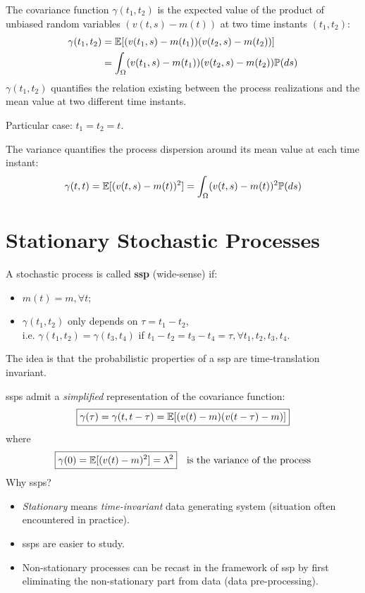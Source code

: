 \begin{defn}
	The covariance function $\gamma(t_{1}, t_{2})$ is the expected value of the product of unbiased random variables $(v(t, s)-m(t))$ at two time instants $(t_{1}, t_{2})$:
	\begin{align*}
		\gamma(t_{1}, t_{2}) &=\mathbb{E}[(v(t_{1}, s)-m(t_{1}))(v(t_{2}, s)-m(t_{2}))] \\
		&=\int_{\Omega}(v(t_{1}, s)-m(t_{1}))(v(t_{2}, s)-m(t_{2})) \mathbb{P}(ds)
	\end{align*}
	$\gamma(t_{1}, t_{2})$ quantifies the relation existing between the process realizations and the mean value at two different time instants.
\end{defn}

Particular case: $t_{1}=t_{2}=t$.
\begin{defn}[Variance]
	The variance quantifies the process dispersion around its mean value at each time instant:
	\[
		\gamma(t, t)=\mathbb{E}[(v(t, s)-m(t))^{2}]=\int_{\Omega}(v(t, s)-m(t))^{2} \mathbb{P}(ds)
	\]
\end{defn}

\section{Stationary Stochastic Processes}
\begin{defn}
	A stochastic process is called \textbf{\gls{ssp}} (wide-sense) if:
	\begin{itemize}
		\item $m(t)=m, \forall t$;
		\item $\gamma(t_{1}, t_{2})$ only depends on $\tau=t_{1}-t_{2}$,\\
		i.e. $\gamma(t_{1}, t_{2})=\gamma(t_{3}, t_{4})$ if $t_{1}-t_{2}=t_{3}-t_{4}=\tau, \forall t_{1}, t_{2}, t_{3}, t_{4}$.
	\end{itemize}
\end{defn}
The idea is that the probabilistic properties of a \gls{ssp} are time-translation invariant.

\glspl{ssp} admit a \emph{simplified} representation of the covariance function:
\[
	\boxed{\gamma(\tau)=\gamma(t, t-\tau)=\mathbb{E}[(v(t)-m)(v(t-\tau)-m)]}
\]
where
\[
	\boxed{\gamma(0)=\mathbb{E}[(v(t)-m)^{2}]=\lambda^2} \quad \text{is the variance of the process}
\]
Why \glspl{ssp}?
\begin{itemize}
	\item \emph{Stationary} means \emph{time-invariant} data generating system (situation often encountered in practice).
	\item \glspl{ssp} are easier to study.
	\item Non-stationary processes can be recast in the framework of \gls{ssp} by first eliminating the non-stationary part from data (data pre-processing).
\end{itemize}

